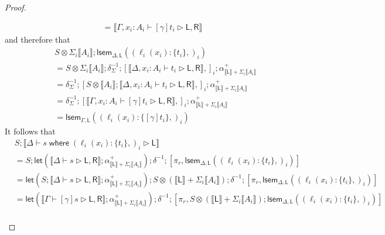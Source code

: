 \documentclass[acmsmall,screen,review]{acmart}
\newcommand{\ms}[1]{\ensuremath{\mathsf{#1}}}
\newcommand{\lto}{:}
\newcommand{\where}[2]{#1\;\ms{where}\;#2}
\newcommand{\wbranch}[3]{#1(#2) \lto \{#3\}}
\newcommand{\bhyp}[2]{#1 : #2}
\newcommand{\haslb}[3]{#1 \vdash #2 \rhd #3}
\newcommand{\dnt}[1]{\llbracket{#1}\rrbracket}
\newcommand{\loopmor}[3]{\ms{lsem}_{#1, #3}(#2)}
\newcommand{\lmor}[1]{\ms{let}(#1)}
\begin{document}
\begin{proof}
\begin{itemize}[leftmargin=*]
\begin{equation}
\begin{aligned}
          = \dnt{\haslb{\Gamma, \bhyp{x_i}{A_i}}{[\gamma]t_i}{\ms{L}, \ms{R}}}
      \end{aligned}
    \end{equation}
    and therefore that
    \begin{equation}
      \begin{aligned}
        & S \otimes \Sigma_i\dnt{A_i} 
        ; \loopmor{\Delta}{(\wbranch{\ell_i}{x_i}{t_i},)_i}{\ms{L}} \\
        & = S \otimes \Sigma_i\dnt{A_i} 
        ; \delta^{-1}_{\Sigma} ; 
        [ 
          \dnt{\haslb{\Delta, \bhyp{x_i}{A_i}}{t_i}{\ms{L}, \ms{R}}},
        ]_i
        ; \alpha^+_{\dnt{\ms{L}} + \Sigma_i \dnt{A_i}} \\
        & = \delta^{-1}_{\Sigma} ; 
        [ 
          S \otimes \dnt{A_i} ;
          \dnt{\haslb{\Delta, \bhyp{x_i}{A_i}}{t_i}{\ms{L}, \ms{R}}},
        ]_i
        ; \alpha^+_{\dnt{\ms{L}} + \Sigma_i \dnt{A_i}} \\
        & = \delta^{-1}_{\Sigma} ; 
        [ 
          \dnt{\haslb{\Gamma, \bhyp{x_i}{A_i}}{[\gamma]t_i}{\ms{L}, \ms{R}}},
        ]_i
        ; \alpha^+_{\dnt{\ms{L}} + \Sigma_i \dnt{A_i}} \\
        & = \loopmor{\Gamma}{(\wbranch{\ell_i}{x_i}{[\gamma]t_i},)_i}{\ms{L}}
      \end{aligned}
    \end{equation}
    It follows that
    \begin{equation}
      \begin{aligned}
        & S
          ; \dnt{\haslb{\Delta}{\where{s}{(\wbranch{\ell_i}{x_i}{t_i},)_i}}{\ms{L}}} \\
        & = S
          ; \lmor{\dnt{\haslb{\Delta}{s}{\ms{L}, \ms{R}}} 
            ; \alpha^+_{\dnt{\ms{L}} + \Sigma_i \dnt{A_i}}}
          ; \delta^{-1}
          ; [\pi_r, \loopmor{\Delta}{(\wbranch{\ell_i}{x_i}{t_i},)_i}{\ms{L}}] \\
        & = \lmor{S ; \dnt{\haslb{\Delta}{s}{\ms{L}, \ms{R}}} 
            ; \alpha^+_{\dnt{\ms{L}} + \Sigma_i \dnt{A_i}}}
          ; S \otimes (\dnt{\ms{L}} + \Sigma_i \dnt{A_i})
          ; \delta^{-1}
          ; [\pi_r, \loopmor{\Delta}{(\wbranch{\ell_i}{x_i}{t_i},)_i}{\ms{L}}] \\
        & = \lmor{\dnt{\haslb{\Gamma}{[\gamma]s}{\ms{L}, \ms{R}}} 
            ; \alpha^+_{\dnt{\ms{L}} + \Sigma_i \dnt{A_i}}}
          ; \delta^{-1}
          ; [\pi_r, 
            S \otimes (\dnt{\ms{L}} + \Sigma_i \dnt{A_i}) 
            ; \loopmor{\Delta}{(\wbranch{\ell_i}{x_i}{t_i},)_i}{\ms{L}}] \\

\end{aligned}
\end{equation}
\end{itemize}
\end{proof}
\end{document}
